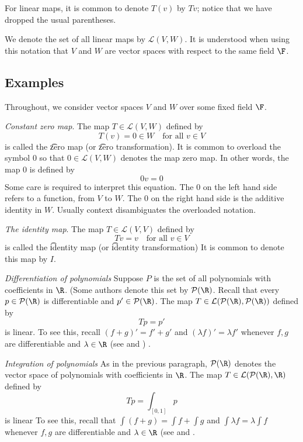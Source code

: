 For linear maps, it is common to denote $T(v)$ by $Tv$; notice that we have dropped the usual parentheses.

We denote the set of all linear maps by $\mathcal{L} (V, W)$.
It is understood when using this notation that $V$ and $W$ are vector spaces with respect to the same field $\F $.

\subsection*{Examples}

Throughout, we consider vector spaces $V$ and $W$ over some fixed field $\F $.

\textit{Constant zero map}.
The map $T \in \mathcal{L} (V, W)$ defined by
\[
T(v) = 0 \in W \quad \text{for all } v \in V
\]
is called the \t{zero map} (or \t{zero transformation}).
It is common to overload the symbol 0 so that $0 \in \mathcal{L} (V, W)$ denotes the map zero map.
In other words, the map $0$ is defined by
\[
0v = 0
\]
Some care is required to interpret this equation.
The 0 on the left hand side refers to a function, from $V$ to $W$.
The 0 on the right hand side is the additive identity in $W$.
Usually context disambiguates the overloaded notation.

\textit{The identity map}.
The map $T \in \mathcal{L} (V, V)$ defined by
\[
Tv = v \quad \text{for all } v \in V
\]
is called the \t{identity map} (or \t{identity transformation})
It is common to denote this map by $I$.

\textit{Differentiation of polynomials}
Suppose $P$ is the set of all polynomials with coefficients in $\R $.
(Some authors denote this set by $\mathcal{P} (\R )$.
Recall that every $p \in \mathcal{P} (\R )$ is differentiable and $p' \in \mathcal{P} (\R )$.
The map $T \in \mathcal{L} (\mathcal{P} (\R ), \mathcal{P} (\R ))$ defined by
\[
Tp = p'
\]
is linear.
To see this, recall $(f + g)' = f' + g'$ and $(\lambda f)' = \lambda f'$ whenever $f, g$ are differentiable and $\lambda  \in \R $ (see and ) .

\textit{Integration of polynomials}
As in the previous paragraph, $\mathcal{P} (\R )$ denotes the vector space of polynomials with coefficients in $\R $.
The map $T \in \mathcal{L} (\mathcal{P} (\R ), \R )$ defined by
\[
Tp = \int _{[0,1]} p
\]
is linear
To see this, recall that $\int (f + g) = \int f + \int g$ and $\int \lambda f = \lambda \int f$ whenever $f, g$ are differentiable and $\lambda  \in \R $ (see and .

